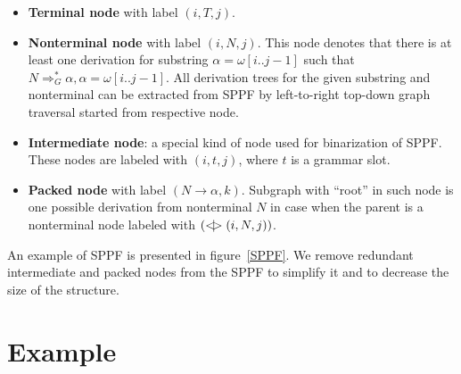 \begin{itemize}
    \item \textbf{Terminal node} with label $(i, T, j)$.
    \item \textbf{Nonterminal node} with label $(i, N, j)$. 
    This node denotes that there is at least one derivation for substring $\alpha=\omega[i..j-1]$ such that $N \Rightarrow^*_G \alpha, \alpha = \omega[i..j-1] $.
    All derivation trees for the given substring and nonterminal can be extracted from SPPF by left-to-right top-down graph traversal started from respective node.     
    \item \textbf{Intermediate node}: a special kind of node used for binarization of SPPF. These nodes are labeled with $(i,t,j)$, where $t$ is a grammar slot.
    \item \textbf{Packed node} with label $(N \rightarrow \alpha, k)$. 
    Subgraph with ``root'' in such node is one possible derivation from nonterminal $N$ in case when the parent is a nonterminal node labeled with $(<\mkern-9mu | \mkern-9mu> (i, N, j))$.

\end{itemize}

An example of SPPF is presented in figure~\ref{SPPF}. We remove redundant intermediate and packed nodes from the SPPF to simplify it and to decrease the size of the structure.



\section{Example}









